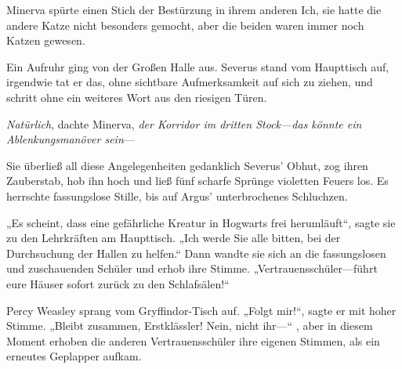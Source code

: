 Minerva spürte einen Stich der Bestürzung in ihrem anderen Ich, sie hatte die andere Katze nicht besonders gemocht, aber die beiden waren immer noch Katzen gewesen.

Ein Aufruhr ging von der Großen Halle aus. Severus stand vom Haupttisch auf, irgendwie tat er das, ohne sichtbare Aufmerksamkeit auf sich zu ziehen, und schritt ohne ein weiteres Wort aus den riesigen Türen.

\emph{Natürlich}, dachte Minerva, \emph{der Korridor im dritten Stock—das könnte ein Ablenkungsmanöver sein}—


Sie überließ all diese Angelegenheiten gedanklich Severus' Obhut, zog ihren Zauberstab, hob ihn hoch und ließ fünf scharfe Sprünge violetten Feuers los.
Es herrschte fassungslose Stille, bis auf Argus' unterbrochenes Schluchzen.

„Es scheint, dass eine gefährliche Kreatur in Hogwarts frei herumläuft“, sagte sie zu den Lehrkräften am Haupttisch. „Ich werde Sie alle bitten, bei der Durchsuchung der Hallen zu helfen.“ Dann wandte sie sich an die fassungslosen und zuschauenden Schüler und erhob ihre Stimme. „Vertrauensschüler—führt eure Häuser sofort zurück zu den Schlafsälen!“

Percy Weasley sprang vom Gryffindor-Tisch auf. „Folgt mir!“, sagte er mit hoher Stimme. „Bleibt zusammen, Erstklässler! Nein, nicht ihr—“ , aber in diesem Moment erhoben die anderen Vertrauensschüler ihre eigenen Stimmen, als ein erneutes Geplapper aufkam.

